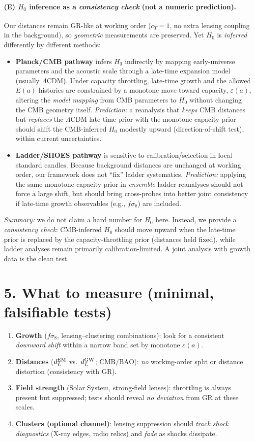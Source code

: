 \documentclass[aps,prd,onecolumn,superscriptaddress,nofootinbib]{revtex4-2}
\newcommand{\eps}{\varepsilon}
\begin{document}
\paragraph*{(E) $H_0$ inference as a \emph{consistency check} (not a numeric prediction).}
Our distances remain GR-like at working order ($c_T=1$, no extra lensing coupling in the background), so \emph{geometric} measurements are preserved. Yet $H_0$ is \emph{inferred} differently by different methods:
\begin{itemize}
\item \textbf{Planck/CMB pathway} infers $H_0$ indirectly by mapping early-universe parameters and the acoustic scale through a late-time expansion model (usually $\Lambda$CDM). Under capacity throttling, late-time growth and the allowed $E(a)$ histories are constrained by a monotone move toward capacity, $\varepsilon(a)$, altering the \emph{model mapping} from CMB parameters to $H_0$ without changing the CMB geometry itself. \emph{Prediction:} a reanalysis that \emph{keeps} CMB distances but \emph{replaces} the $\Lambda$CDM late-time prior with the monotone-capacity prior should shift the CMB-inferred $H_0$ modestly upward (direction-of-shift test), within current uncertainties.
\item \textbf{Ladder/SHOES pathway} is sensitive to calibration/selection in local standard candles. Because background distances are unchanged at working order, our framework does not ``fix'' ladder systematics. \emph{Prediction:} applying the same monotone-capacity prior in \emph{ensemble} ladder reanalyses should not force a large shift, but should bring cross-probes into better joint consistency if late-time growth observables (e.g., $f\sigma_8$) are included.
\end{itemize}
\emph{Summary:} we do not claim a hard number for $H_0$ here. Instead, we provide a \emph{consistency check}: CMB-inferred $H_0$ should move upward when the late-time prior is replaced by the capacity-throttling prior (distances held fixed), while ladder analyses remain primarily calibration-limited. A joint analysis with growth data is the clean test.

\section*{5. What to measure (minimal, falsifiable tests)}
\begin{enumerate}
\item \textbf{Growth} ($f\sigma_8$, lensing--clustering combinations): look for a consistent \emph{downward shift} within a narrow band set by monotone $\eps(a)$.
\item \textbf{Distances} ($d_L^{\rm EM}$ vs.\ $d_L^{\rm GW}$; CMB/BAO): \emph{no} working-order split or distance distortion (consistency with GR).
\item \textbf{Field strength} (Solar System, strong-field lenses): throttling is always present but suppressed; tests should reveal \emph{no deviation} from GR at these scales.
\item \textbf{Clusters (optional channel)}: lensing suppression should \emph{track shock diagnostics} (X-ray edges, radio relics) and \emph{fade} as shocks dissipate.
\end{enumerate}
\end{document}
